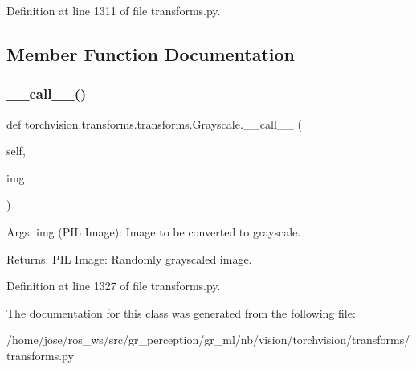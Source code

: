 Definition at line 1311 of file transforms.\+py.



\subsection{Member Function Documentation}
\mbox{\label{classtorchvision_1_1transforms_1_1transforms_1_1Grayscale_ab719550f9f0d8446966b4744cb7c8ec3}} 
\subsubsection{\texorpdfstring{\+\_\+\+\_\+call\+\_\+\+\_\+()}{\_\_call\_\_()}}
{\footnotesize\ttfamily def torchvision.\+transforms.\+transforms.\+Grayscale.\+\_\+\+\_\+call\+\_\+\+\_\+ (\begin{DoxyParamCaption}\item[{}]{self,  }\item[{}]{img }\end{DoxyParamCaption})}

\begin{DoxyVerb}Args:
    img (PIL Image): Image to be converted to grayscale.

Returns:
    PIL Image: Randomly grayscaled image.
\end{DoxyVerb}
 

Definition at line 1327 of file transforms.\+py.



The documentation for this class was generated from the following file\+:\begin{DoxyCompactItemize}
\item 
/home/jose/ros\+\_\+ws/src/gr\+\_\+perception/gr\+\_\+ml/nb/vision/torchvision/transforms/transforms.\+py\end{DoxyCompactItemize}
